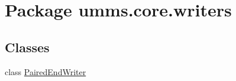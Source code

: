 \hypertarget{namespaceumms_1_1core_1_1writers}{\section{Package umms.\+core.\+writers}
\label{namespaceumms_1_1core_1_1writers}
}
\subsection*{Classes}
\begin{DoxyCompactItemize}
\item 
class \hyperlink{classumms_1_1core_1_1writers_1_1_paired_end_writer}{Paired\+End\+Writer}
\end{DoxyCompactItemize}
